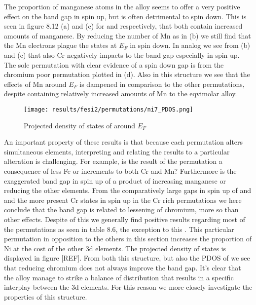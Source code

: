 The proportion of manganese atoms in the alloy seems to offer a very positive effect on the band gap in spin up, but is often detrimental to spin down. This is seen in figure 8.12 (a) and (c) for  and  respectively, that both contain increased amounts of manganese. By reducing the number of Mn as in (b) we still find that the Mn electrons plague the states at $E_F$ in spin down. In analog we see from (b) and (c) that also Cr negatively impacts to the band gap especially in spin up. The sole permutation with clear evidence of a spin down gap is from the chromium poor permutation plotted in (d). Also in this structure we see that the effects of Mn around $E_F$ is dampened in comparison to the other permutations, despite containing relatively increased amounts of Mn to the eqvimolar alloy.  

\begin{figure}[H]
	\centering
	\texttt{[image: results/fesi2/permutations/ni7\_PDOS.png]}
	\caption{Projected density of states of  around $E_F$}
\end{figure}

An important property of these results is that because each permutation alters simultaneous elements, interpreting and relating the results to a particular alteration is challenging. For example, is the result of the  permutation a consequence of less Fe or increments to both Cr and Mn? Furthermore is the exaggerated band gap in spin up of  a product of increasing manganese or reducing the other elements. From the comparatively large gaps in spin up of  and  and the more present Cr states in spin up in the Cr rich permutations we here conclude that the band gap is related to lessening of chromium, more so than other effects. Despite of this we generally find positive results regarding most of the permutations as seen in table 8.6, the exception to this . This particular permutation in opposition to the others in this section increases the proportion of Ni at the cost of the other 3d elements. The projected density of states is displayed in figure [REF]. From both this structure, but also the PDOS of  we see that reducing chromium does not always improve the band gap. It's clear that the  alloy manage to strike a balance of distribution that results in a specific interplay between the 3d elements. For this reason we more closely investigate the properties of this structure.

